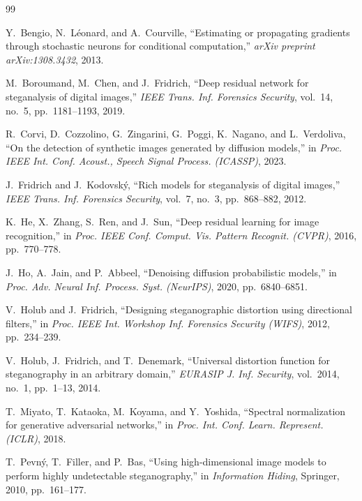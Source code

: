 \documentclass[journal]{IEEEtran}
\begin{document}

\begin{thebibliography}{99}

Y.~Bengio, N.~L\'{e}onard, and A.~Courville, ``Estimating or
propagating gradients through stochastic neurons for conditional
computation,'' \emph{arXiv preprint arXiv:1308.3432}, 2013.

M.~Boroumand, M.~Chen, and J.~Fridrich, ``Deep residual network for
steganalysis of digital images,'' \emph{IEEE Trans. Inf. Forensics
Security}, vol.~14, no.~5, pp.~1181--1193, 2019.

R.~Corvi, D.~Cozzolino, G.~Zingarini, G.~Poggi, K.~Nagano, and
L.~Verdoliva, ``On the detection of synthetic images generated by
diffusion models,'' in \emph{Proc. IEEE Int. Conf. Acoust., Speech
Signal Process. (ICASSP)}, 2023.

J.~Fridrich and J.~Kodovsk\'{y}, ``Rich models for steganalysis of
digital images,'' \emph{IEEE Trans. Inf. Forensics Security},
vol.~7, no.~3, pp.~868--882, 2012.

K.~He, X.~Zhang, S.~Ren, and J.~Sun, ``Deep residual learning for
image recognition,'' in \emph{Proc. IEEE Conf. Comput. Vis. Pattern
Recognit. (CVPR)}, 2016, pp.~770--778.

J.~Ho, A.~Jain, and P.~Abbeel, ``Denoising diffusion probabilistic
models,'' in \emph{Proc. Adv. Neural Inf. Process. Syst. (NeurIPS)},
2020, pp.~6840--6851.

V.~Holub and J.~Fridrich, ``Designing steganographic distortion using
directional filters,'' in \emph{Proc. IEEE Int. Workshop Inf.
Forensics Security (WIFS)}, 2012, pp.~234--239.

V.~Holub, J.~Fridrich, and T.~Denemark, ``Universal distortion
function for steganography in an arbitrary domain,'' \emph{EURASIP
J. Inf. Security}, vol.~2014, no.~1, pp.~1--13, 2014.

T.~Miyato, T.~Kataoka, M.~Koyama, and Y.~Yoshida, ``Spectral
normalization for generative adversarial networks,'' in \emph{Proc.
Int. Conf. Learn. Represent. (ICLR)}, 2018.

T.~Pevn\'{y}, T.~Filler, and P.~Bas, ``Using high-dimensional image
models to perform highly undetectable steganography,'' in
\emph{Information Hiding}, Springer, 2010, pp.~161--177.


\end{thebibliography}
\end{document}

